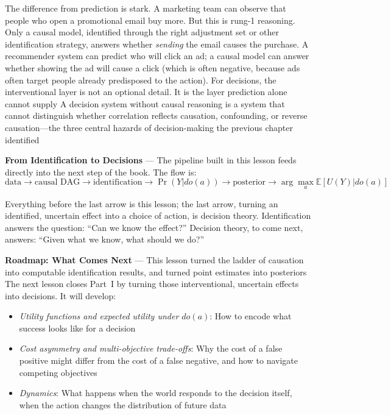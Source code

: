 The difference from prediction is stark. A marketing team can observe that
people who open a promotional email buy more. But this is rung-1 reasoning. Only
a causal model, identified through the right adjustment set or other identification
strategy, answers whether \emph{sending} the email causes the purchase. A
recommender system can predict who will click an ad; a causal model can answer whether
showing the ad will cause a click (which is often negative, because ads often target
people already predisposed to the action). For decisions, the interventional
layer is not an optional detail. It is the layer prediction alone cannot supply A
decision system without causal reasoning is a system that cannot distinguish whether
correlation reflects causation, confounding, or reverse causation—the three central
hazards of decision-making the previous chapter identified

\textbf{From Identification to Decisions} --- The pipeline built in this lesson feeds
directly into the next step of the book. The flow is:
\begin{equation}
  \text{data}\to \text{causal DAG}\to \text{identification}\to \Pr(Y|do(a)) \to \text{posterior}
  \to \arg\max_{a}\mathbb{E}[U(Y)|do(a)] \label{eq:causal-pipeline}
\end{equation}

Everything before the last arrow is this lesson; the last arrow, turning an
identified, uncertain effect into a choice of action, is decision theory. Identification
answers the question: ``Can we know the effect?'' Decision theory, to come next,
answers: ``Given what we know, what should we do?''

\textbf{Roadmap: What Comes Next} --- This lesson turned the ladder of causation
into computable identification results, and turned point estimates into posteriors
The next lesson closes Part~I by turning those interventional, uncertain effects
into decisions. It will develop:

\begin{itemize}
  \item \emph{Utility functions and expected utility under $do(a)$}: How to encode
    what success looks like for a decision

  \item \emph{Cost asymmetry and multi-objective trade-offs}: Why the cost of a false
    positive might differ from the cost of a false negative, and how to navigate
    competing objectives

  \item \emph{Dynamics}: What happens when the world responds to the decision itself,
    when the action changes the distribution of future data
\end{itemize}

